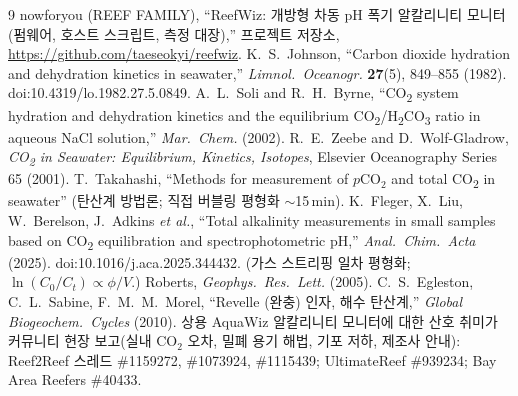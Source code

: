 \documentclass[11pt]{article}
\newcommand{\co}{\ensuremath{\mathrm{CO_2}}}
\begin{document}
\begin{thebibliography}{9}
 nowforyou (REEF FAMILY), ``ReefWiz: 개방형 차동 pH 폭기
알칼리니티 모니터(펌웨어, 호스트 스크립트, 측정 대장),'' 프로젝트 저장소,
\url{https://github.com/taeseokyi/reefwiz}.
 K.~S.~Johnson, ``Carbon dioxide hydration and dehydration
kinetics in seawater,'' \emph{Limnol.\ Oceanogr.} \textbf{27}(5), 849--855
(1982). doi:10.4319/lo.1982.27.5.0849.
 A.~L.~Soli and R.~H.~Byrne, ``CO\textsubscript{2} system
hydration and dehydration kinetics and the equilibrium CO\textsubscript{2}/H\textsubscript{2}CO\textsubscript{3}
ratio in aqueous NaCl solution,'' \emph{Mar.\ Chem.} (2002).
 R.~E.~Zeebe and D.~Wolf-Gladrow, \emph{CO\textsubscript{2}
in Seawater: Equilibrium, Kinetics, Isotopes}, Elsevier Oceanography Series 65
(2001).
 T.~Takahashi, ``Methods for measurement of
$p\mathrm{CO_2}$ and total CO\textsubscript{2} in seawater'' (탄산계 방법론;
직접 버블링 평형화 $\sim$15\,min).
 K.~Fleger, X.~Liu, W.~Berelson, J.~Adkins \emph{et al.},
``Total alkalinity measurements in small samples based on
CO\textsubscript{2} equilibration and spectrophotometric pH,''
\emph{Anal.\ Chim.\ Acta} (2025). doi:10.1016/j.aca.2025.344432.
 (가스 스트리핑 일차 평형화;
$\ln(C_0/C_t)\propto \phi/V$.) Roberts, \emph{Geophys.\ Res.\ Lett.} (2005).
 C.~S.~Egleston, C.~L.~Sabine, F.~M.~M.~Morel,
``Revelle (완충) 인자, 해수 탄산계,''
\emph{Global Biogeochem.\ Cycles} (2010).
 상용 AquaWiz 알칼리니티 모니터에 대한 산호 취미가 커뮤니티 현장
보고(실내 \co{} 오차, 밀폐 용기 해법, 기포 저하, 제조사 안내): Reef2Reef 스레드
\#1159272, \#1073924, \#1115439; UltimateReef \#939234; Bay Area Reefers \#40433.
\end{thebibliography}
\end{document}
